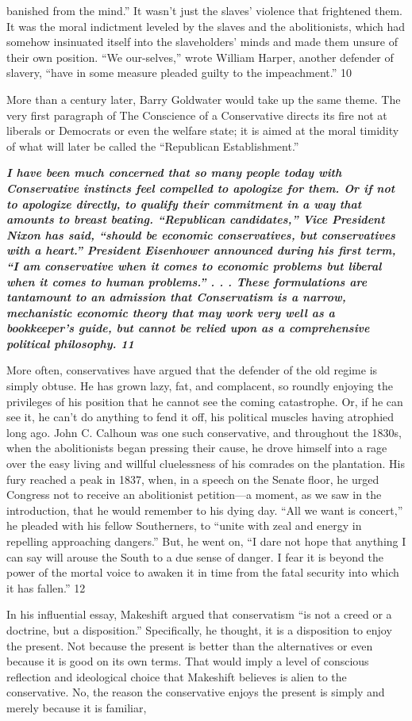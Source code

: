 banished from the mind.” It wasn’t just the slaves’ violence that frightened them. It was the moral indictment leveled by the slaves and the abolitionists, which had somehow insinuated itself into the slaveholders’ minds and made them unsure of their own position. “We our-selves,” wrote William Harper, another defender of slavery, “have in some measure pleaded guilty to the impeachment.” {\color{blue} 10 } {\par} More than a century later, Barry Goldwater would take up the same theme. The very first paragraph of The Conscience of a Conservative directs its fire not at liberals or Democrats or even the welfare state; it is aimed at the moral timidity of what will later be called the “Republican Establishment.”{\par} {\textbf{\textit{I have been much concerned that so many people today with Conservative instincts feel compelled to apologize for them. Or if not to apologize directly, to qualify their commitment in a way that amounts to breast beating. “Republican candidates,” Vice President Nixon has said, “should be economic conservatives, but conservatives with a heart.” President Eisenhower announced during his first term, “I am conservative when it comes to economic problems but liberal when it comes to human problems.” . . . These formulations are tantamount to an admission that Conservatism is a narrow, mechanistic economic theory that may work very well as a bookkeeper’s guide, but cannot be relied upon as a comprehensive political philosophy. {\color{blue} 11 } } } }{\par} More often, conservatives have argued that the defender of the old regime is simply obtuse. He has grown lazy, fat, and complacent, so roundly enjoying the privileges of his position that he cannot see the coming catastrophe. Or, if he can see it, he can’t do anything to fend it off, his political muscles having atrophied long ago. John C. Calhoun was one such conservative, and throughout the 1830s, when the abolitionists began pressing their cause, he drove himself into a rage over the easy living and willful cluelessness of his comrades on the plantation. His fury reached a peak in 1837, when, in a speech on the Senate floor, he urged Congress not to receive an abolitionist petition—a moment, as we saw in the introduction, that he would remember to his dying day. “All we want is concert,” he pleaded with his fellow Southerners, to “unite with zeal and energy in repelling approaching dangers.” But, he went on, “I dare not hope that anything I can say will arouse the South to a due sense of danger. I fear it is beyond the power of the mortal voice to awaken it in time from the fatal security into which it has fallen.” {\color{blue} 12 } {\par} In his influential essay, Makeshift argued that conservatism “is not a creed or a doctrine, but a disposition.” Specifically, he thought, it is a disposition to enjoy the present. Not because the present is better than the alternatives or even because it is good on its own terms. That would imply a level of conscious reflection and ideological choice that Makeshift believes is alien to the conservative. No, the reason the conservative enjoys the present is simply and merely because it is familiar, 